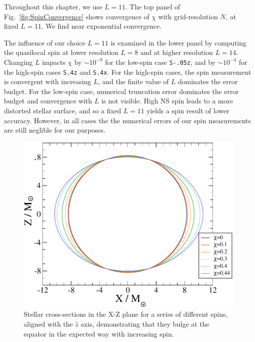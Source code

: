 Throughout this chapter, we use $L=11$. The top panel of
Fig.~\ref{fig:SpinConvergence} shows convergence of $\chi$ with
grid-resolution $N$, at fixed $L=11$. We find near exponential
convergence.

The influence of our choice $L=11$ is examined in the lower panel by
computing the quasilocal spin at lower resolution $L=8$ and at higher
resolution $L=14$. Changing $L$ impacts $\chi$ by $\sim 10^{-8}$ for
the low-spin case {\tt S-.05z}, and by $\sim 10^{-4}$ for the high-spin
cases {\tt S.4z} and {\tt S.4x}. For the high-spin cases, the spin
  measurement is convergent with increasing $L$, and the finite value
  of $L$ dominates the error budget. For the low-spin case, numerical
  truncation error dominates the error budget and convergence with $L$
  is not visible. High NS spin leads to a more distorted stellar
  surface, and so a fixed $L=11$ yields a spin result of lower
  accuracy. However, in all cases the the numerical errors of our
  spin measurements are still neglible for our purposes.

\begin{figure}
\includegraphics[width=0.98\columnwidth]{chap2/Bulging}
\caption[Stellar cross-section for a series of different spins.]{{\label{fig:Bulging}}Stellar cross-sections in the X-Z plane for a
  series of different spins, aligned with the $\hat{z}$ axis,
  demonstrating that they bulge at the equator in the expected way
  with increasing spin.}
\end{figure}


